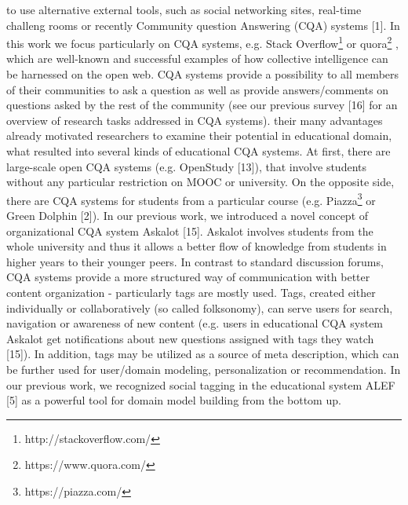 \documentclass{sig-alternate}
\begin{document}
to use alternative external tools, such as social networking sites,
real-time challeng rooms or recently Community question Answering (CQA) systems [1]. In this work we focus particularly on CQA systems, e.g. Stack Overflow\footnote{http://stackoverflow.com/} or quora\footnote{https://www.quora.com/}%
, which are well-known and successful examples of how collective intelligence can be harnessed on the open web. CQA systems provide a possibility to all members of their communities to ask a question as well as provide answers/comments on questions asked by the rest of the community (see our previous survey [16] for an overview of research tasks addressed in CQA systems). their many advantages already motivated researchers to examine their potential in educational domain, what resulted into several kinds of educational CQA systems. At first, there are large-scale open CQA systems (e.g. OpenStudy [13]), that involve students without any particular restriction on MOOC
or university. On the opposite side, there are CQA systems for students from a particular course (e.g. Piazza\footnote{https://piazza.com/} or Green Dolphin [2]). In our previous work, we introduced a novel concept of organizational CQA system Askalot [15]. Askalot involves students from the whole university and thus it allows a better flow of knowledge
from students in higher years to their younger peers. In contrast to standard discussion forums, CQA systems provide a more structured way of communication with better content organization - particularly tags are mostly used. Tags, created either
individually or collaboratively (so called folksonomy), can serve users for search, navigation or awareness of new content (e.g. users in educational CQA system Askalot get notifications about new questions assigned with tags they watch [15]). In addition, tags may be utilized as a source of meta description, which can be further
used for user/domain modeling, personalization or recommendation. In our previous work, we recognized social tagging in the educational system ALEF [5] as a powerful tool for domain model building from the bottom up.
\end{document}
